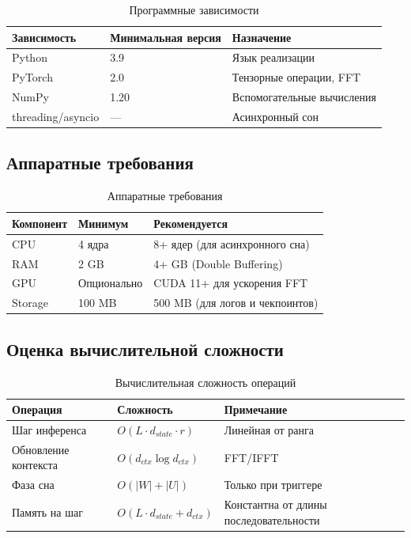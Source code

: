 \begin{table}[h]
\centering
\caption{Программные зависимости}
\label{tab:dependencies}
\begin{tabular}{lp{3cm}p{6cm}}
\toprule
\textbf{Зависимость} & \textbf{Минимальная версия} & \textbf{Назначение} \\
\midrule
Python & 3.9 & Язык реализации \\
PyTorch & 2.0 & Тензорные операции, FFT \\
NumPy & 1.20 & Вспомогательные вычисления \\
threading/asyncio & --- & Асинхронный сон \\
\bottomrule
\end{tabular}
\end{table}

\subsection{Аппаратные требования}

\begin{table}[h]
\centering
\caption{Аппаратные требования}
\label{tab:hardware}
\begin{tabular}{lpp{6cm}}
\toprule
\textbf{Компонент} & \textbf{Минимум} & \textbf{Рекомендуется} \\
\midrule
CPU & 4 ядра & 8+ ядер (для асинхронного сна) \\
RAM & 2 GB & 4+ GB (Double Buffering) \\
GPU & Опционально & CUDA 11+ для ускорения FFT \\
Storage & 100 MB & 500 MB (для логов и чекпоинтов) \\
\bottomrule
\end{tabular}
\end{table}

\subsection{Оценка вычислительной сложности}

\begin{table}[h]
\centering
\caption{Вычислительная сложность операций}
\label{tab:complexity}
\begin{tabular}{lp{5cm}p{4cm}}
\toprule
\textbf{Операция} & \textbf{Сложность} & \textbf{Примечание} \\
\midrule
Шаг инференса & $O(L \cdot d_{state} \cdot r)$ & Линейная от ранга \\
Обновление контекста & $O(d_{ctx} \log d_{ctx})$ & FFT/IFFT \\
Фаза сна & $O(|W| + |U|)$ & Только при триггере \\
Память на шаг & $O(L \cdot d_{state} + d_{ctx})$ & Константна от длины последовательности \\
\bottomrule
\end{tabular}
\end{table}

